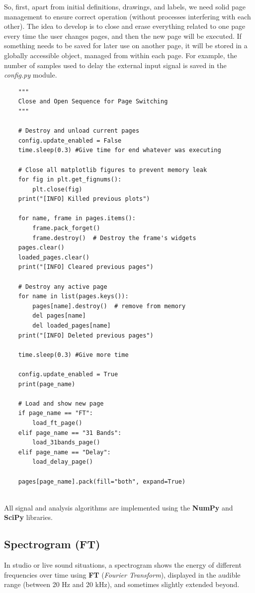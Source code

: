 So, first, apart from initial definitions, drawings, and labels, we need solid page management to ensure correct operation (without processes interfering with each other). The idea to develop is to close and erase everything related to one page every time the user changes pages, and then the new page will be executed. If something needs to be saved for later use on another page, it will be stored in a globally accessible object, managed from within each page. For example, the number of samples used to delay the external input signal is saved in the \textit{config.py} module.

\begin{verbatim}
	"""
	Close and Open Sequence for Page Switching
	"""
	
	# Destroy and unload current pages
	config.update_enabled = False
	time.sleep(0.3) #Give time for end whatever was executing
	
	# Close all matplotlib figures to prevent memory leak
	for fig in plt.get_fignums():
		plt.close(fig)
	print("[INFO] Killed previous plots")
	
	for name, frame in pages.items():
		frame.pack_forget()
		frame.destroy()  # Destroy the frame's widgets
	pages.clear()
	loaded_pages.clear()
	print("[INFO] Cleared previous pages")
	
	# Destroy any active page
	for name in list(pages.keys()):
		pages[name].destroy()  # remove from memory
		del pages[name]
		del loaded_pages[name]
	print("[INFO] Deleted previous pages")
	
	time.sleep(0.3) #Give more time
	
	config.update_enabled = True
	print(page_name)
	
	# Load and show new page
	if page_name == "FT":
		load_ft_page()
	elif page_name == "31 Bands":
		load_31bands_page()
	elif page_name == "Delay":
		load_delay_page()
	
	pages[page_name].pack(fill="both", expand=True)
	
\end{verbatim}

All signal and analysis algorithms are implemented using the \textbf{NumPy}\cite{numpy} and \textbf{SciPy}\cite{scipy_signal} libraries.

\subsection{Spectrogram (FT)}

In studio or live sound situations, a spectrogram shows the energy of different frequencies over time using \textbf{FT} (\textit{Fourier Transform}), displayed in the audible range (between 20 Hz and 20 kHz), and sometimes slightly extended beyond.

